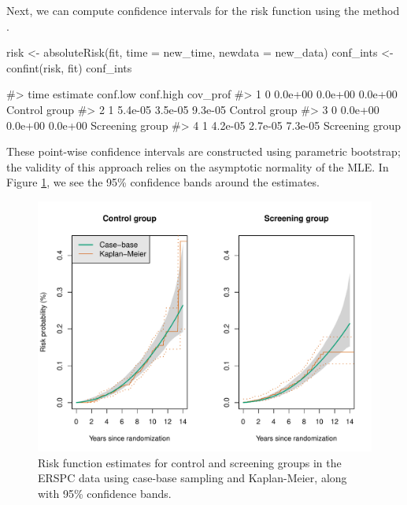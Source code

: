 Next, we can compute confidence intervals for the risk function using
the method .

\begin{Schunk}
\begin{Sinput}
risk <- absoluteRisk(fit, time = new_time, newdata = new_data)
conf_ints <- confint(risk, fit)
conf_ints
\end{Sinput}
\begin{Soutput}
#>   time estimate conf.low conf.high        cov_prof
#> 1    0  0.0e+00  0.0e+00   0.0e+00   Control group
#> 2    1  5.4e-05  3.5e-05   9.3e-05   Control group
#> 3    0  0.0e+00  0.0e+00   0.0e+00 Screening group
#> 4    1  4.2e-05  2.7e-05   7.3e-05 Screening group
\end{Soutput}
\end{Schunk}

These point-wise confidence intervals are constructed using parametric
bootstrap; the validity of this approach relies on the asymptotic
normality of the MLE. In Figure \ref{fig:erspc-cif-conf}, we see the
95\% confidence bands around the estimates.

\begin{Schunk}
\begin{figure}[ht]
\includegraphics[width=\textwidth,keepaspectratio=true]{./erspc-cif-conf-1} \caption[Risk function estimates for control and screening groups in the ERSPC data using case-base sampling and Kaplan-Meier, along with 95\% confidence bands]{Risk function estimates for control and screening groups in the ERSPC data using case-base sampling and Kaplan-Meier, along with 95\% confidence bands.}\label{fig:erspc-cif-conf}
\end{figure}
\end{Schunk}

